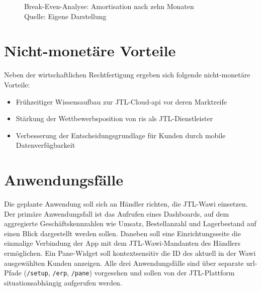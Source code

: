 \documentclass[11pt, a4paper, oneside]{report}
\begin{document}
\begin{figure}[H]
  \centering
  \caption[Break-Even-Analyse: Amortisation nach zehn Monaten]{Break-Even-Analyse: Amortisation nach zehn Monaten\\\footnotesize Quelle: Eigene Darstellung}
  \label{fig:breakeven}
\end{figure}

\section{Nicht-monetäre Vorteile}

Neben der wirtschaftlichen Rechtfertigung ergeben sich folgende nicht-monetäre Vorteile:

\begin{itemize}[leftmargin=1.5em]
  \item Frühzeitiger Wissensaufbau zur JTL-Cloud-\gls{api} vor deren Marktreife
  \item Stärkung der Wettbewerbsposition von \gls{ris} als JTL-Dienstleister
  \item Verbesserung der Entscheidungsgrundlage für Kunden durch mobile Datenverfügbarkeit
\end{itemize}

\section{Anwendungsfälle}

Die geplante Anwendung soll sich an Händler richten, die JTL-Wawi einsetzen. Der primäre
Anwendungsfall ist das Aufrufen eines Dashboards, auf dem aggregierte
Geschäftskennzahlen wie Umsatz, Bestellanzahl und Lagerbestand auf einen
Blick dargestellt werden sollen. Daneben soll eine Einrichtungsseite die
einmalige Verbindung der App mit dem JTL-Wawi-Mandanten des Händlers ermöglichen.
Ein Pane-Widget soll kontextsensitiv die ID des aktuell in der Wawi
ausgewählten Kunden anzeigen. Alle drei Anwendungsfälle sind über separate
\gls{url}-Pfade (\texttt{/setup}, \texttt{/erp}, \texttt{/pane}) vorgesehen
und sollen von der JTL-Plattform situationsabhängig aufgerufen werden.
\end{document}
